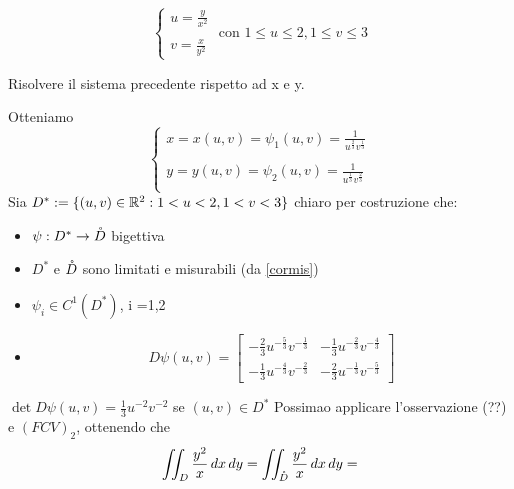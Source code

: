 \begin{exercise}
\begin{itemize}
                $$\left\{\begin{array}{l}
                  u = \frac{y}{x^2} \\
                  \\
                  v = \frac{x}{y^2}
                \end{array}\right. \text{ con } 1 \leq u \leq 2 , 1 \leq v \leq 3$$
                \begin{exercise}
                  Risolvere il sistema precedente rispetto ad x e y.
                \end{exercise}
                Otteniamo 
                $$\left\{\begin{array}{l}
                  x = x(u,v) = \psi_1(u,v) = \frac{1}{u^{\frac{2}{3}}v^{\frac{1}{3}}} \\
                  \\
                  y = y(u,v) = \psi_2(u,v) = \frac{1}{u^{\frac{1}{3}}v^{\frac{2}{3}}} \\
                \end{array}\right.$$
                Sia $D^* :=\{(u,v) \in \mathbb{R}^2 : 1 < u < 2, 1 < v < 3\}$
                \ace chiaro per costruzione che:
                \begin{itemize}
                  \item $\psi : D^* \to \mathring{D}$ \ace bigettiva
                  \item $D^*$ e $\mathring{D}$ sono limitati e misurabili (da \ref{cormis})
                  \item $\psi_i \in C^1(D^*)$, i =1,2
                  \item \begin{exercise}
                    $$D\psi(u,v) = \begin{bmatrix}
                      -\frac{2}{3} u^{-\frac{5}{3}}v^{-\frac{1}{3}} & -\frac{1}{3} u^{-\frac{2}{3}}v^{-\frac{4}{3}}  \\
                      -\frac{1}{3} u^{-\frac{4}{3}}v^{-\frac{2}{3}} & -\frac{2}{3} u^{-\frac{1}{3}}v^{-\frac{5}{3}} 
                    \end{bmatrix}$$
                  \end{exercise}
                \end{itemize}
                $\det D\psi(u,v) = \frac{1}{3} u^{-2} v^{-2}$ se $(u,v) \in D^*$
                Possimao applicare l'osservazione (??) e $(FCV)_2$, ottenendo che 
                $$\iint_{D} \frac{y^2}{x} \,dx\,dy = \iint_{\mathring{D}} \frac{y^2}{x} \,dx \,dy = $$

\end{itemize}
\end{exercise}
